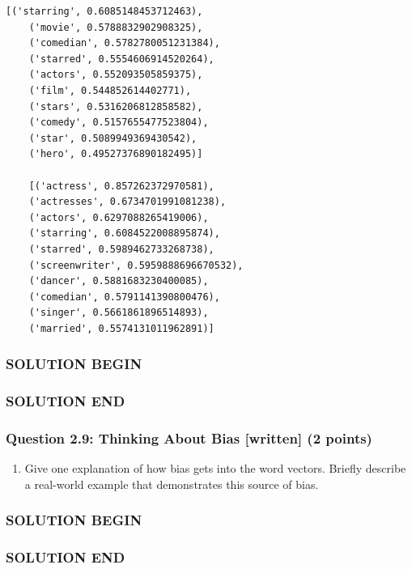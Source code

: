 \documentclass[11pt]{article}
\providecommand{\tightlist}{%
      \setlength{\itemsep}{0pt}\setlength{\parskip}{0pt}}
\begin{document}
\begin{Verbatim}[commandchars=\\\{\}]
    [('starring', 0.6085148453712463),
    ('movie', 0.5788832902908325),
    ('comedian', 0.5782780051231384),
    ('starred', 0.5554606914520264),
    ('actors', 0.552093505859375),
    ('film', 0.544852614402771),
    ('stars', 0.5316206812858582),
    ('comedy', 0.5157655477523804),
    ('star', 0.5089949369430542),
    ('hero', 0.49527376890182495)]

    [('actress', 0.857262372970581),
    ('actresses', 0.6734701991081238),
    ('actors', 0.6297088265419006),
    ('starring', 0.6084522008895874),
    ('starred', 0.5989462733268738),
    ('screenwriter', 0.5959888696670532),
    ('dancer', 0.5881683230400085),
    ('comedian', 0.5791141390800476),
    ('singer', 0.5661861896514893),
    ('married', 0.5574131011962891)]
\end{Verbatim}

\subsubsection{SOLUTION BEGIN}\label{solution-begin}

\subsubsection{SOLUTION END}\label{solution-end}

\subsubsection{Question 2.9: Thinking About Bias {[}written{]} (2
points)}\label{question-2.9-thinking-about-bias-written-2-points}

\begin{enumerate}
    \def\labelenumi{\alph{enumi}.}
    \tightlist
    \item
          Give one explanation of how bias gets into the word vectors. Briefly
          describe a real-world example that demonstrates this source of bias.
\end{enumerate}

\subsubsection{SOLUTION BEGIN}\label{solution-begin}

\subsubsection{SOLUTION END}\label{solution-end}
\end{document}
